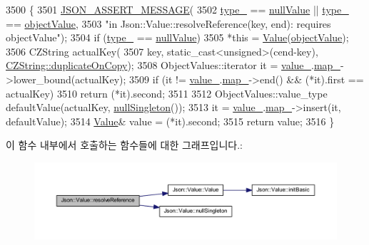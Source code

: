 \begin{DoxyCode}
3500 \{
3501   \hyperlink{json_8h_ad7facdeeca0f495765e3b204c265eadb}{JSON\_ASSERT\_MESSAGE}(
3502       \hyperlink{class_json_1_1_value_abd222c2536dc88bf330dedcd076d2356}{type\_} == \hyperlink{namespace_json_a7d654b75c16a57007925868e38212b4ea7d9899633b4409bd3fc107e6737f8391}{nullValue} || \hyperlink{class_json_1_1_value_abd222c2536dc88bf330dedcd076d2356}{type\_} == \hyperlink{namespace_json_a7d654b75c16a57007925868e38212b4eae8386dcfc36d1ae897745f7b4f77a1f6}{objectValue},
3503       \textcolor{stringliteral}{"in Json::Value::resolveReference(key, end): requires objectValue"});
3504   \textcolor{keywordflow}{if} (\hyperlink{class_json_1_1_value_abd222c2536dc88bf330dedcd076d2356}{type\_} == \hyperlink{namespace_json_a7d654b75c16a57007925868e38212b4ea7d9899633b4409bd3fc107e6737f8391}{nullValue})
3505     *\textcolor{keyword}{this} = \hyperlink{class_json_1_1_value_ada6ba1369448fb0240bccc36efaa46f7}{Value}(\hyperlink{namespace_json_a7d654b75c16a57007925868e38212b4eae8386dcfc36d1ae897745f7b4f77a1f6}{objectValue});
3506   CZString actualKey(
3507       key, static\_cast<unsigned>(cend-key), \hyperlink{class_json_1_1_value_1_1_c_z_string_a2805c46fb4a72bbaed55de6d75941b6da5c18c35205a3be63ad14ce659e70fe7d}{CZString::duplicateOnCopy});
3508   ObjectValues::iterator it = \hyperlink{class_json_1_1_value_aef578244546212705b9f81eb84d7e151}{value\_}.\hyperlink{union_json_1_1_value_1_1_value_holder_a1e7a5b86d4f52234f55c847ad1ce389a}{map\_}->lower\_bound(actualKey);
3509   \textcolor{keywordflow}{if} (it != \hyperlink{class_json_1_1_value_aef578244546212705b9f81eb84d7e151}{value\_}.\hyperlink{union_json_1_1_value_1_1_value_holder_a1e7a5b86d4f52234f55c847ad1ce389a}{map\_}->end() && (*it).first == actualKey)
3510     \textcolor{keywordflow}{return} (*it).second;
3511 
3512   ObjectValues::value\_type defaultValue(actualKey, \hyperlink{class_json_1_1_value_af2f124567acc35d021a424e53ebdfcab}{nullSingleton}());
3513   it = \hyperlink{class_json_1_1_value_aef578244546212705b9f81eb84d7e151}{value\_}.\hyperlink{union_json_1_1_value_1_1_value_holder_a1e7a5b86d4f52234f55c847ad1ce389a}{map\_}->insert(it, defaultValue);
3514   \hyperlink{class_json_1_1_value}{Value}& value = (*it).second;
3515   \textcolor{keywordflow}{return} value;
3516 \}
\end{DoxyCode}
이 함수 내부에서 호출하는 함수들에 대한 그래프입니다.\+:\nopagebreak
\begin{figure}[H]
\begin{center}
\leavevmode
\includegraphics[width=350pt]{class_json_1_1_value_a5f6b3aaf4f2e952a33dd823db008c333_cgraph}
\end{center}
\end{figure}
\mbox{\label{class_json_1_1_value_a29f3a30f7e5d3af6f38d57999bf5b480}} 
